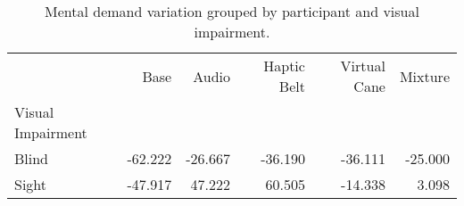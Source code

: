 
\begin{table}[!htb]
\centering
\caption{Mental demand variation grouped by participant and visual impairment.}
\label{tab:md_var_average_group}
\begin{tabular}{lrrrrr}
\toprule
{} &    Base &   Audio &  Haptic Belt &  Virtual Cane &  Mixture \\
Visual Impairment &         &         &              &               &          \\
\midrule
Blind             & -62.222 & -26.667 &      -36.190 &       -36.111 &  -25.000 \\
Sight             & -47.917 &  47.222 &       60.505 &       -14.338 &    3.098 \\
\bottomrule
\end{tabular}
\end{table}

